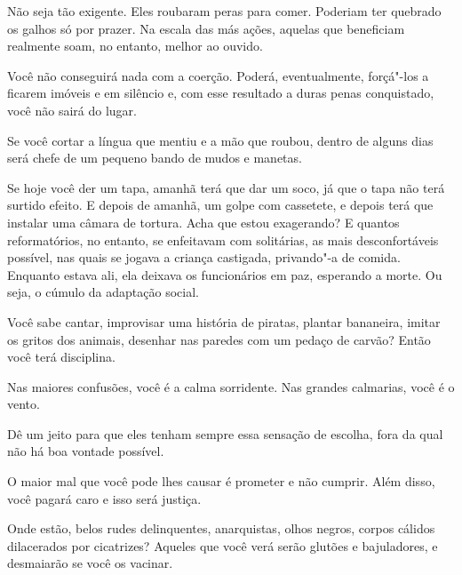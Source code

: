 \bigskip
\bigskip

Não seja tão exigente. Eles roubaram peras para comer. Poderiam ter
quebrado os galhos só por prazer. Na escala das más ações, aquelas que
beneficiam realmente soam, no entanto, melhor ao ouvido.

\bigskip
\bigskip

Você não conseguirá nada com a coerção. Poderá, eventualmente, forçá"-los
a ficarem imóveis e em silêncio e, com esse resultado a duras penas
conquistado, você não sairá do lugar.

\bigskip
\bigskip

Se você cortar a língua que mentiu e a mão que roubou, dentro de alguns
dias será chefe de um pequeno bando de mudos e manetas.

\bigskip
\bigskip

Se hoje você der um tapa, amanhã terá que dar um soco, já que o tapa não
terá surtido efeito. E depois de amanhã, um golpe com cassetete, e
depois terá que instalar uma câmara de tortura. Acha que estou
exagerando? E quantos reformatórios, no entanto, se enfeitavam com
solitárias, as mais desconfortáveis possível, nas quais se jogava a
criança castigada, privando"-a de comida. Enquanto estava ali, ela
deixava os funcionários em paz, esperando a morte. Ou seja, o cúmulo da
adaptação social.

\bigskip
\bigskip

Você sabe cantar, improvisar uma história de piratas, plantar bananeira,
imitar os gritos dos animais, desenhar nas paredes com um pedaço de
carvão? Então você terá disciplina.

\bigskip
\bigskip

Nas maiores confusões, você é a calma sorridente. Nas grandes calmarias,
você é o vento.

\bigskip
\bigskip

Dê um jeito para que eles tenham sempre essa sensação de escolha, fora
da qual não há boa vontade possível.

\bigskip
\bigskip

O maior mal que você pode lhes causar é prometer e não cumprir. Além
disso, você pagará caro e isso será justiça.

\bigskip
\bigskip

Onde estão, belos rudes delinquentes, anarquistas, olhos negros, corpos
cálidos dilacerados por cicatrizes? Aqueles que você verá serão glutões
e bajuladores, e desmaiarão se você os vacinar.

\bigskip
\bigskip

